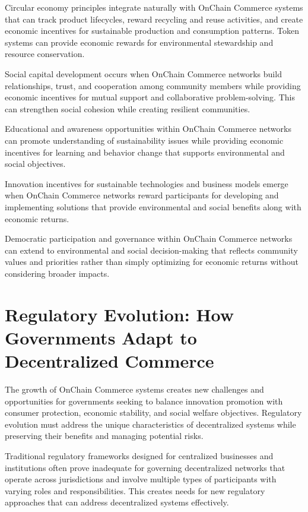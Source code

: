 \documentclass[
  Letterpaper,
]{scrbook}
\begin{document}
Circular economy principles integrate naturally with OnChain Commerce
systems that can track product lifecycles, reward recycling and reuse
activities, and create economic incentives for sustainable production
and consumption patterns. Token systems can provide economic rewards for
environmental stewardship and resource conservation.

Social capital development occurs when OnChain Commerce networks build
relationships, trust, and cooperation among community members while
providing economic incentives for mutual support and collaborative
problem-solving. This can strengthen social cohesion while creating
resilient communities.

Educational and awareness opportunities within OnChain Commerce networks
can promote understanding of sustainability issues while providing
economic incentives for learning and behavior change that supports
environmental and social objectives.

Innovation incentives for sustainable technologies and business models
emerge when OnChain Commerce networks reward participants for developing
and implementing solutions that provide environmental and social
benefits along with economic returns.

Democratic participation and governance within OnChain Commerce networks
can extend to environmental and social decision-making that reflects
community values and priorities rather than simply optimizing for
economic returns without considering broader impacts.

\section{Regulatory Evolution: How Governments Adapt to Decentralized
Commerce}\label{regulatory-evolution-how-governments-adapt-to-decentralized-commerce}

The growth of OnChain Commerce systems creates new challenges and
opportunities for governments seeking to balance innovation promotion
with consumer protection, economic stability, and social welfare
objectives. Regulatory evolution must address the unique characteristics
of decentralized systems while preserving their benefits and managing
potential risks.

Traditional regulatory frameworks designed for centralized businesses
and institutions often prove inadequate for governing decentralized
networks that operate across jurisdictions and involve multiple types of
participants with varying roles and responsibilities. This creates needs
for new regulatory approaches that can address decentralized systems
effectively.
\end{document}

